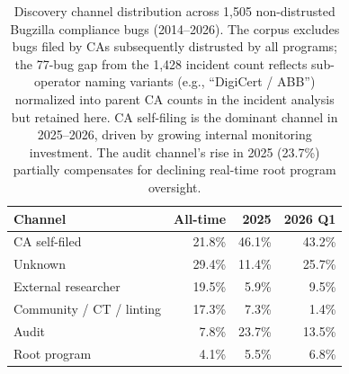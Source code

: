 \documentclass[10pt,twocolumn,letterpaper]{article}
\begin{document}
\begin{table}[t]
\centering
\footnotesize
\caption{Discovery channel distribution across 1,505 non-distrusted
Bugzilla compliance bugs (2014--2026). The corpus excludes bugs filed
by CAs subsequently distrusted by all programs; the 77-bug gap from
the 1,428 incident count reflects sub-operator naming variants
(e.g., ``DigiCert / ABB'') normalized into parent CA counts in the
incident analysis but retained here. CA self-filing is the dominant
channel in 2025--2026, driven by growing internal monitoring investment.
The audit channel's rise in 2025 (23.7\%) partially compensates for
declining real-time root program oversight.}
\label{tab:discovery}
\begin{tabularx}{\columnwidth}{@{}Xrrr@{}}
\toprule
Channel & All-time & 2025 & 2026 Q1 \\
\midrule
CA self-filed            & 21.8\% & 46.1\% & 43.2\% \\
Unknown                  & 29.4\% & 11.4\% & 25.7\% \\
External researcher      & 19.5\% &  5.9\% &  9.5\% \\
Community / CT / linting & 17.3\% &  7.3\% &  1.4\% \\
Audit                    &  7.8\% & 23.7\% & 13.5\% \\
Root program             &  4.1\% &  5.5\% &  6.8\% \\
\bottomrule
\end{tabularx}
\end{table}
\end{document}
